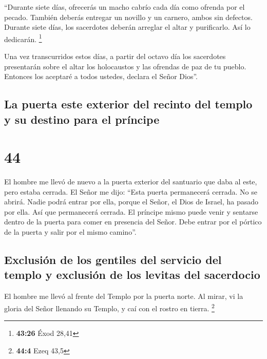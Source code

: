  ``Durante siete días, ofrecerás un macho cabrío cada día
como ofrenda por el pecado. También deberás entregar un novillo y un
carnero, ambos sin defectos.  Durante siete días, los
sacerdotes deberán arreglar el altar y purificarlo. Así lo dedicarán.
\footnote{\textbf{43:26} Éxod 28,41}

 Una vez transcurridos estos días, a partir del octavo
día los sacerdotes presentarán sobre el altar los holocaustos y las
ofrendas de paz de tu pueblo. Entonces los aceptaré a todos ustedes,
declara el Señor Dios''.

\hypertarget{la-puerta-este-exterior-del-recinto-del-templo-y-su-destino-para-el-pruxedncipe}{%
\subsection{La puerta este exterior del recinto del templo y su destino
para el
príncipe}\label{la-puerta-este-exterior-del-recinto-del-templo-y-su-destino-para-el-pruxedncipe}}

\hypertarget{section-43}{%
\section{44}\label{section-43}}

 El hombre me llevó de nuevo a la puerta exterior del
santuario que daba al este, pero estaba cerrada.  El Señor
me dijo: ``Esta puerta permanecerá cerrada. No se abrirá. Nadie podrá
entrar por ella, porque el Señor, el Dios de Israel, ha pasado por ella.
Así que permanecerá cerrada.  El príncipe mismo puede
venir y sentarse dentro de la puerta para comer en presencia del Señor.
Debe entrar por el pórtico de la puerta y salir por el mismo camino''.

\hypertarget{exclusiuxf3n-de-los-gentiles-del-servicio-del-templo-y-exclusiuxf3n-de-los-levitas-del-sacerdocio}{%
\subsection{Exclusión de los gentiles del servicio del templo y
exclusión de los levitas del
sacerdocio}\label{exclusiuxf3n-de-los-gentiles-del-servicio-del-templo-y-exclusiuxf3n-de-los-levitas-del-sacerdocio}}

 El hombre me llevó al frente del Templo por la puerta
norte. Al mirar, vi la gloria del Señor llenando su Templo, y caí con el
rostro en tierra. \footnote{\textbf{44:4} Ezeq 43,5}

